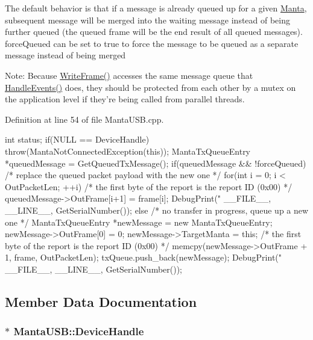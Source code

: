 \-The default behavior is that if a message is already queued up for a given \hyperlink{classManta}{\-Manta}, subsequent message will be merged into the waiting message instead of being further queued (the queued frame will be the end result of all queued messages). force\-Queued can be set to true to force the message to be queued as a separate message instead of being merged

\-Note\-: \-Because \hyperlink{classMantaUSB_a38a9bc76333bab47574c63e1fe610002}{\-Write\-Frame()} accesses the same message queue that \hyperlink{classMantaUSB_a4d55c1c1d9e769ce7a0ef532a72221e8}{\-Handle\-Events()} does, they should be protected from each other by a mutex on the application level if they're being called from parallel threads. 

\-Definition at line 54 of file \-Manta\-U\-S\-B.\-cpp.


\begin{DoxyCode}
{
   int status;
   if(NULL == DeviceHandle)
   {
      throw(MantaNotConnectedException(this));
   }
   MantaTxQueueEntry *queuedMessage = GetQueuedTxMessage();
   if(queuedMessage && !forceQueued)
   {
      /* replace the queued packet payload with the new one */
      for(int i = 0; i < OutPacketLen; ++i)
      {
         /* the first byte of the report is the report ID (0x00) */
         queuedMessage->OutFrame[i+1] = frame[i];
      }
      DebugPrint("%
            __FILE__, __LINE__, GetSerialNumber());
   }
   else
   {
      /* no transfer in progress, queue up a new one */
      MantaTxQueueEntry *newMessage = new MantaTxQueueEntry;
      newMessage->OutFrame[0] = 0;
      newMessage->TargetManta = this;
      /* the first byte of the report is the report ID (0x00) */
      memcpy(newMessage->OutFrame + 1, frame, OutPacketLen);
      txQueue.push_back(newMessage);
      DebugPrint("%
            __FILE__, __LINE__, GetSerialNumber());
   }
}
\end{DoxyCode}


\subsection{\-Member \-Data \-Documentation}
\hypertarget{classMantaUSB_ab1b01bd783ce58a4cfceadaf593759e8}{
\subsubsection[{\-Device\-Handle}]{$\ast$ {\bf \-Manta\-U\-S\-B\-::\-Device\-Handle}}}\label{classMantaUSB_ab1b01bd783ce58a4cfceadaf593759e8}


